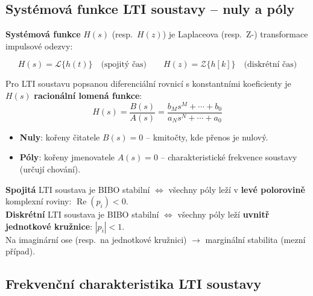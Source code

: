 \documentclass[12pt,a4paper]{article}
\newcommand{\LT}{\mathcal{L}}
\newcommand{\ZT}{\mathcal{Z}}
\begin{document}
\begin{hvezdBox}
\subsection*{Systémová funkce LTI soustavy – nuly a póly}
\end{hvezdBox}

\textbf{Systémová funkce} $H(s)$ (resp.\ $H(z)$) je Laplaceova (resp.\ Z-) transformace impulsové odezvy:

\begin{matBox}
\[
  H(s) = \LT\{h(t)\} \quad \text{(spojitý čas)}
  \qquad
  H(z) = \ZT\{h[k]\} \quad \text{(diskrétní čas)}
\]
\end{matBox}

Pro LTI soustavu popsanou diferenciální rovnicí s konstantními koeficienty je $H(s)$ \textbf{racionální lomená funkce}:
\[
  H(s) = \frac{B(s)}{A(s)} = \frac{b_M s^M + \cdots + b_0}{a_N s^N + \cdots + a_0}
\]

\begin{itemize}
  \item \textbf{Nuly}: kořeny čitatele $B(s) = 0$ – kmitočty, kde přenos je nulový.
  \item \textbf{Póly}: kořeny jmenovatele $A(s) = 0$ – charakteristické frekvence soustavy (určují chování).
\end{itemize}

\begin{infoBox}
\textbf{Spojitá} LTI soustava je BIBO stabilní $\Leftrightarrow$ všechny póly leží v \textbf{levé polorovině} komplexní roviny: $\operatorname{Re}(p_i) < 0$.\\[4pt]
\textbf{Diskrétní} LTI soustava je BIBO stabilní $\Leftrightarrow$ všechny póly leží \textbf{uvnitř jednotkové kružnice}: $|p_i| < 1$.\\[4pt]
Na imaginární ose (resp.\ na jednotkové kružnici) $\to$ marginální stabilita (mezní případ).
\end{infoBox}

\begin{hvezdBox}
\subsection*{Frekvenční charakteristika LTI soustavy}
\end{hvezdBox}
\end{document}

